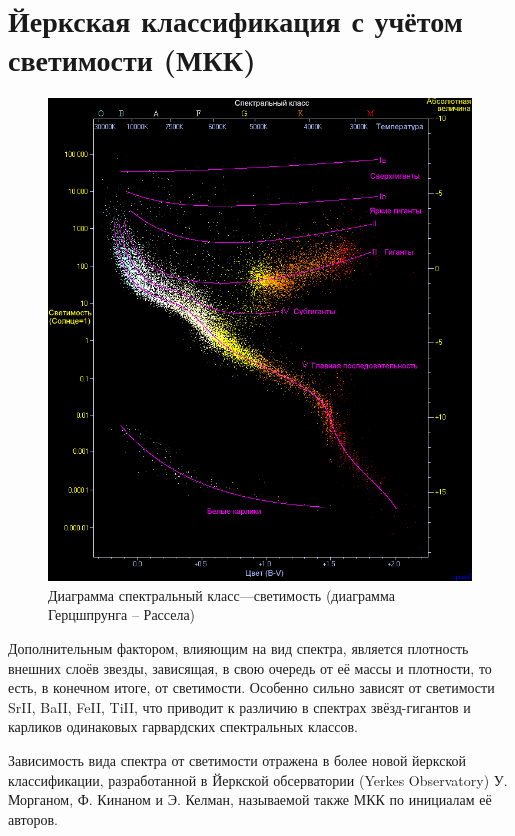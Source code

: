 \documentclass[12pt,a4paper]{article}
\begin{document}
\section{Йеркская классификация с учётом светимости (МКК)}

\begin{figure}
\includegraphics[scale=0.4]{2.png}
{\footnotesize Диаграмма спектральный класс—светимость (диаграмма Герцшпрунга -- Рассела)}
\end{figure}

Дополнительным фактором, влияющим на вид спектра, является плотность внешних слоёв звезды, зависящая, в свою очередь от её массы и плотности, то есть, в конечном итоге, от светимости. Особенно сильно зависят от светимости SrII, BaII, FeII, TiII, что приводит к различию в спектрах звёзд-гигантов и карликов одинаковых гарвардских спектральных классов.

Зависимость вида спектра от светимости отражена в более новой йеркской классификации, разработанной в Йеркской обсерватории (Yerkes Observatory) У. Морганом, Ф. Кинаном и Э. Келман, называемой также МКК по инициалам её авторов.
\end{document}
